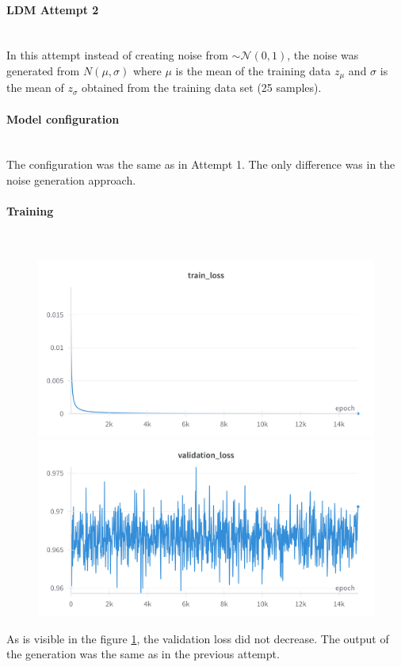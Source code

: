 
\paragraph{LDM Attempt 2}\mbox{}\\

\indent In this attempt instead of creating noise from $\sim\mathcal{N}(0,1)$, the noise was generated from $N(\mu, \sigma)$ where $\mu$ is the mean of the training data $z_{\mu}$ and $\sigma$ is the mean of $z_{\sigma}$ obtained from the training data set (25 samples).

\paragraph{Model configuration}\mbox{}\\
The configuration was the same as in Attempt 1. The only difference was in the noise generation approach.

\paragraph{Training}\mbox{}\\
\begin{figure}[H]
\includegraphics[width=\linewidth]{detailed_engineering/Monai Diffusion - Attempt 2/charts/train_loss.png}
\caption{}
\endminipage\hfill
{}
\includegraphics[width=\linewidth]{detailed_engineering/Monai Diffusion - Attempt 2/charts/validation_loss.png}
\caption{}
\label{fig:ldm_a2_val_loss}
\endminipage
\end{figure}

As is visible in the figure \ref{fig:ldm_a2_val_loss}, the validation loss did not decrease. The output of the generation was the same as in the previous attempt.



